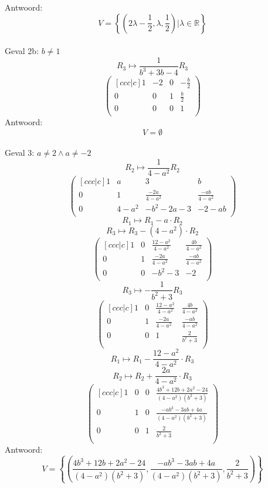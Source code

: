 \documentclass[lineaire_algebra_oplossingen.tex]{subfiles}
\begin{document}
Antwoord:
\[
V= \left\lbrace \left(2\lambda-\frac{1}{2},\lambda,\frac{1}{2}\right)| \lambda \in \mathbb{R}\right\rbrace
\]
\\Geval 2b: $b \neq 1$
\[ R_3 \longmapsto \frac{1}{b^3+3b-4}R_3 \]
\[
\begin{pmatrix}[ccc|c]
1 & -2 & 0 & -\frac{b}{2}\\
0 & 0 & 1 & \frac{b}{2}\\
0 & 0 & 0 & 1\\
\end{pmatrix}
\]
Antwoord:
\[
V= \emptyset
\]
\\Geval 3: $a\neq 2 \wedge a \neq -2$ 
\[ R_2 \longmapsto \frac{1}{4-a^{2}}R_2 \]
\[
\begin{pmatrix}[ccc|c]
1 & a & 3 & b\\
0 & 1 & \frac{-2a}{4-a^{2}} & \frac{-ab}{4-a^{2}}\\
0 & 4-a^{2} & -b^{2}-2a-3 & -2-ab\\
\end{pmatrix}
\]
\[ R_1 \longmapsto R_1 - a \cdot R_2 \]
\[ R_3 \longmapsto R_3 - (4-a^{2}) \cdot R_2 \]
\[
\begin{pmatrix}[ccc|c]
1 & 0 & \frac{12-a^{2}}{4-a^{2}} & \frac{4b}{4-a^{2}}\\
0 & 1 & \frac{-2a}{4-a^{2}} & \frac{-ab}{4-a^{2}}\\
0 & 0 & -b^{2}-3 & -2\\
\end{pmatrix}
\]
\[ R_3 \longmapsto -\frac{1}{b^{2}+3}R_3\]
\[
\begin{pmatrix}[ccc|c]
1 & 0 & \frac{12-a^{2}}{4-a^{2}} & \frac{4b}{4-a^{2}}\\
0 & 1 & \frac{-2a}{4-a^{2}} & \frac{-ab}{4-a^{2}}\\
0 & 0 & 1 & \frac{2}{b^{2}+3}\\
\end{pmatrix}
\]
\[ R_1 \longmapsto R_1 - \frac{12-a^{2}}{4-a^{2}} \cdot R_3 \]
\[ R_2 \longmapsto R_2 + \frac{2a}{4-a^{2}} \cdot R_3 \]
\[
\begin{pmatrix}[ccc|c]
1 & 0 & 0 & \frac{4b^3+12b+2a^2-24}{(4-a^{2})(b^{2}+3)}\\
0 & 1 & 0 & \frac{-ab^{3}-3ab+4a}{(4-a^{2})(b^{2}+3)}\\
0 & 0 & 1 & \frac{2}{b^{2}+3}\\
\end{pmatrix}
\]
Antwoord:
\[
V = \left\lbrace\left(\frac{4b^3+12b+2a^2-24}{(4-a^{2})(b^{2}+3)},\frac{-ab^{3}-3ab+4a}{(4-a^{2})(b^{2}+3)},\frac{2}{b^{2}+3}\right)\right\rbrace
\]
\end{document}
